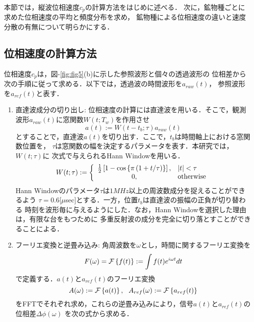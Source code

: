 ﻿本節では，縦波位相速度$c_p$の計算方法をはじめに述べる．
次に，鉱物種ごとに求めた位相速度の平均と頻度分布を求め，
鉱物種による位相速度の違いと速度分散の有無について明らかにする．
\subsection{位相速度の計算方法}
位相速度$c_p$は，図-\ref{fig:fig5}(b)に示した参照波形と個々の透過波形の
位相差から次の手順に従って求める．以下では，透過波の時間波形を$a_{raw}(t)$，
参照波形を$a_{ref}(t)$と表す．
\begin{enumerate}
\item
直達波成分の切り出し: 
位相速度の計算には直達波を用いる．そこで，観測波形$a_{raw}(t)$に窓関数$W(t;T_w)$を作用させ
\begin{equation}
	a(t):=W(t-t_b;\tau)a_{raw}(t)
\end{equation}
とすることで，直達波$a(t)$を切り出す．ここで，$t_b$は時間軸上における窓関数位置を，
$\tau$は窓関数の幅を決定するパラメータを表す．本研究では，$W(t;\tau)$に
次式で与えられるHann Windowを用いる．
\begin{equation}
	W(t;\tau):=\left\{
	\begin{array}{cl}
		\frac{1}{2}\left[ 1-\cos \left\{ \pi\left(1+t/\tau \right) \right\} \right],
		 & \left| t \right| < \tau \\
		0, & {\rm otherwise}
	\end{array}
	\right.
\end{equation}
Hann Windowのパラメータ$\tau$は$1MHz$以上の周波数成分を捉えることができるよう
$\tau=0.6$[$\mu$sec]とする．一方，位置$t_b$は直達波の振幅の正負が切り替わる
時刻を波形毎に与えるようにした．なお，Hann Windowを選択した理由は，有限な台をもつために
多重反射波の成分を完全に切り落とすことができることによる．
\item
フーリエ変換と逆畳み込み:
角周波数を$\omega$とし，時間に関するフーリエ変換を
	\begin{equation}
		F(\omega) ={\cal F} \left\{ f(t)\right\}:=\int f(t) e^{i\omega t}dt 
		\label{eqn:Fourier}
	\end{equation}
で定義する．$a(t)$と$a_{ref}(t)$のフーリエ変換
	\begin{equation}
		A(\omega):={\cal F} \left\{ a(t) \right\}, \ \ 
		A_{ref}(\omega):={\cal F} \left\{ a_{ref} (t)\right\}
	\end{equation}
をFFTでそれぞれ求め，これらの逆畳み込みにより，信号$a(t)$と$a_{ref}(t)$の位相差$\Delta \phi(\omega)$
を次の式から求める．
\begin{equation}

\end{equation}
\end{enumerate}
